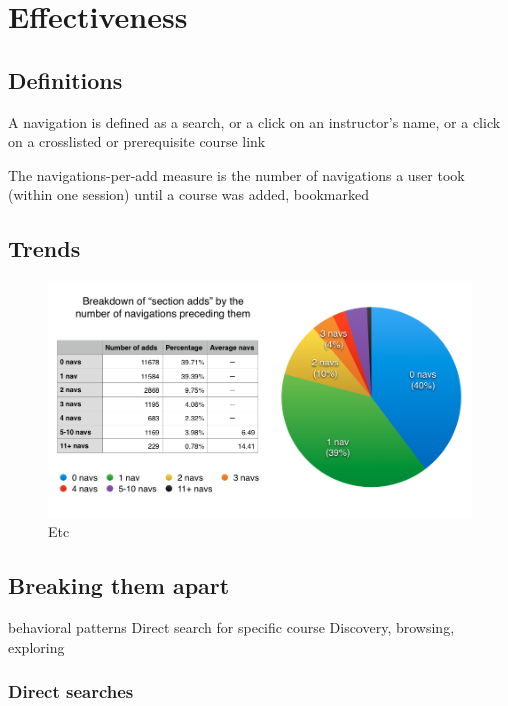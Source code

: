
\section{Effectiveness}

\subsection{Definitions}

A navigation is defined as
a search, or
a click on an instructor’s name, or
a click on a crosslisted or prerequisite course link

The navigations-per-add measure is
the number of navigations a user took (within one session) until a course was added, bookmarked

\subsection{Trends}

\begin{figure}[H]
  \centering
  \includegraphics[width=1.0\textwidth]{images/graph/combined_navs}

  \caption{Etc}
  \label{fig:searchtypes}
\end{figure}

\subsection{Breaking them apart}

  behavioral patterns
  Direct search for specific course
  Discovery, browsing, exploring

  \subsubsection{Direct searches}

